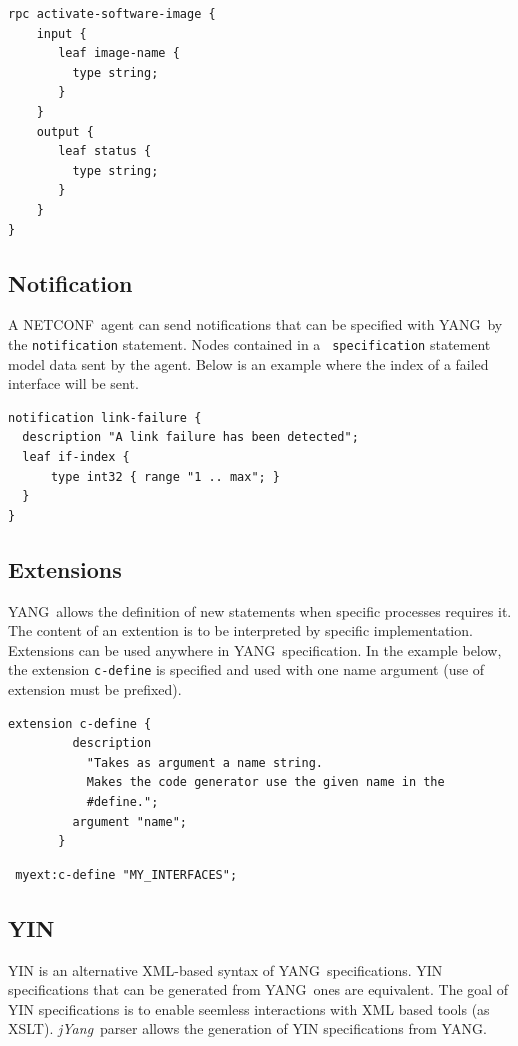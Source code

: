 \documentclass[a4paper]{article}
\newcommand{\jyang}{{\sl jYang}}
\newcommand{\nc}{NETCONF}
\newcommand{\y}{YANG}
\begin{document}
\begin{lstlisting}
rpc activate-software-image {
    input {
       leaf image-name {
         type string;
       }
    }
    output {
       leaf status {
         type string;
       }
    }
}
\end{lstlisting}

\subsection{Notification}

A \nc\ agent can send notifications  that can be specified with \y\ by
the  {\tt   notification}  statement.   Nodes  contained   in  a  {\tt
specification} statement  model data sent  by the agent.  Below  is an
example where the index of a failed interface will be sent.

\begin{lstlisting} 
notification link-failure {
  description "A link failure has been detected";
  leaf if-index {
      type int32 { range "1 .. max"; }
  }
}
\end{lstlisting}

\subsection{Extensions}

\y\ allows  the definition of  new statements when  specific processes
requires  it. The  content of  an extention  is to  be  interpreted by
specific  implementation.   Extensions can  be  used  anywhere in  \y\
specification. In  the example below, the extension  {\tt c-define} is
specified and  used with one name  argument (use of  extension must be
prefixed).

\begin{lstlisting}
extension c-define {
         description
           "Takes as argument a name string.
           Makes the code generator use the given name in the
           #define.";
         argument "name";
       }
\end{lstlisting}

\begin{lstlisting}
 myext:c-define "MY_INTERFACES";
\end{lstlisting}


\subsection{YIN}

YIN  is an  alternative XML-based  syntax of  \y\  specifications. YIN
specifications that can be generated from \y\ ones are equivalent. The
goal of YIN specifications is to enable seemless interactions with XML
based tools  (as XSLT).  \jyang\ parser allows  the generation  of YIN
specifications from \y.
\end{document}
